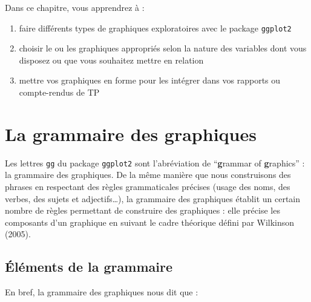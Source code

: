 \documentclass[
  a4paper,
  DIV=11,
  numbers=noendperiod,
  oneside]{scrreprt}
\providecommand{\tightlist}{%
  \setlength{\itemsep}{0pt}\setlength{\parskip}{0pt}}\usepackage{longtable,booktabs,array}
\begin{document}
\begin{tcolorbox}[enhanced jigsaw, arc=.35mm, opacityback=0, colbacktitle=quarto-callout-tip-color!10!white, bottomrule=.15mm, coltitle=black, colframe=quarto-callout-tip-color-frame, breakable, toprule=.15mm, title=\textcolor{quarto-callout-tip-color}{\faLightbulb}\hspace{0.5em}{Objectifs}, leftrule=.75mm, titlerule=0mm, bottomtitle=1mm, toptitle=1mm, left=2mm, rightrule=.15mm, opacitybacktitle=0.6, colback=white]

Dans ce chapitre, vous apprendrez à :

\begin{enumerate}
\def\labelenumi{\arabic{enumi}.}
\tightlist
\item
  faire différents types de graphiques exploratoires avec le package
  \texttt{ggplot2}  
\item
  choisir le ou les graphiques appropriés selon la nature des variables
  dont vous disposez ou que vous souhaitez mettre en relation
\item
  mettre vos graphiques en forme pour les intégrer dans vos rapports ou
  compte-rendus de TP
\end{enumerate}

\end{tcolorbox}

\section{La grammaire des graphiques}\label{sec-gggraph}

Les lettres \texttt{gg} du package \texttt{ggplot2} sont l'abréviation
de ``\textbf{g}rammar of \textbf{g}raphics'' : la grammaire des
graphiques. De la même manière que nous construisons des phrases en
respectant des règles grammaticales précises (usage des noms, des
verbes, des sujets et adjectifs\ldots), la grammaire des graphiques
établit un certain nombre de règles permettant de construire des
graphiques : elle précise les composants d'un graphique en suivant le
cadre théorique défini par Wilkinson (2005).

\subsection{Éléments de la
grammaire}\label{uxe9luxe9ments-de-la-grammaire}

En bref, la grammaire des graphiques nous dit que :
\end{document}
